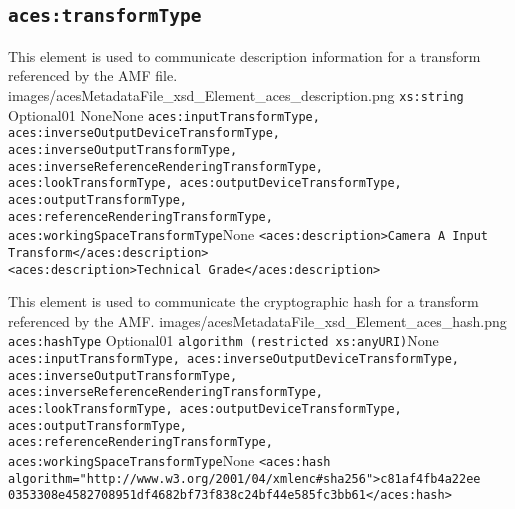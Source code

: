 \subsection{\texttt{aces:transformType}}

		{This element is used to communicate description information for a transform referenced by the AMF file.}
		{images/acesMetadataFile_xsd_Element_aces_description.png}
		{\texttt{xs:string}}
		{Optional}{0}{1}
		{None}{None}
		{\texttt{aces:inputTransformType, aces:inverseOutputDeviceTransformType, \\
        aces:inverseOutputTransformType, aces:inverseReferenceRenderingTransformType, \\
        aces:lookTransformType, aces:outputDeviceTransformType, aces:outputTransformType, \\
        aces:referenceRenderingTransformType, aces:workingSpaceTransformType}}{None}
		{\lstinline{<aces:description>Camera A Input Transform</aces:description>}\\
		 \lstinline{<aces:description>Technical Grade</aces:description>}}

        {This element is used to communicate the cryptographic hash for a transform referenced by the AMF.}
        {images/acesMetadataFile_xsd_Element_aces_hash.png}
        {\texttt{aces:hashType}}
        {Optional}{0}{1}
        {\texttt{algorithm (restricted xs:anyURI)}}{None}
        {\texttt{aces:inputTransformType, aces:inverseOutputDeviceTransformType, \\
        aces:inverseOutputTransformType, aces:inverseReferenceRenderingTransformType, \\
        aces:lookTransformType, aces:outputDeviceTransformType, aces:outputTransformType, \\
        aces:referenceRenderingTransformType, aces:workingSpaceTransformType}}{None}
        {
        \lstinline{<aces:hash algorithm="http://www.w3.org/2001/04/xmlenc#sha256">c81af4fb4a22ee}\\      \lstinline{0353308e4582708951df4682bf73f838c24bf44e585fc3bb61</aces:hash>}
        }